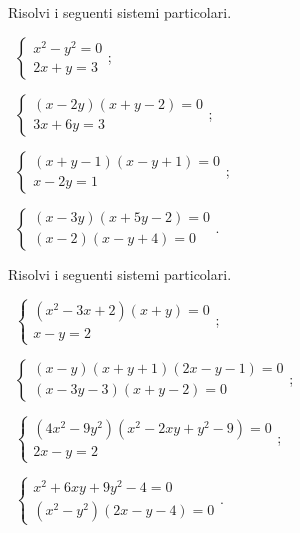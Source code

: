 \begin{esercizio}[\Ast]
\label{ese:6.57}
Risolvi i seguenti sistemi particolari.
\begin{multicols}{2}
 \begin{enumeratea}
 \item~$\left\{\begin{array}{l}x^2-y^2=0\\2x+y=3\end{array}\right.$;
 \item~$\left\{\begin{array}{l}(x-2y)(x+y-2)=0\\3x+6y=3\end{array}\right.$;
 \item~$\left\{\begin{array}{l}(x+y-1)(x-y+1)=0\\x-2y=1\end{array}\right.$;
 \item~$\left\{\begin{array}{l}(x-3y)(x+5y-2)=0\\(x-2)(x-y+4)=0\end{array}\right.$.
 \end{enumeratea}
\end{multicols}
\end{esercizio}

\begin{esercizio}[\Ast]
\label{ese:6.58}
Risolvi i seguenti sistemi particolari.
\begin{multicols}{2}
 \begin{enumeratea}
 \item~$\left\{\begin{array}{l}(x^2-3x+2)(x+y)=0\\x-y=2\end{array}\right.$;
 \item~$\left\{\begin{array}{l}(x-y)(x+y+1)(2x-y-1)=0\\(x-3y-3)(x+y-2)=0\end{array}\right.$;
 \item~$\left\{\begin{array}{l}(4x^2-9y^2)(x^2-2xy+y^2-9)=0 \\2x-y=2 \end{array}\right.$;
 \item~$\left\{\begin{array}{l}x^2+6xy+9y^2-4=0\\(x^2-y^2)(2x-y-4)=0\end{array}\right.$.
 \end{enumeratea}
\end{multicols}
\end{esercizio}

